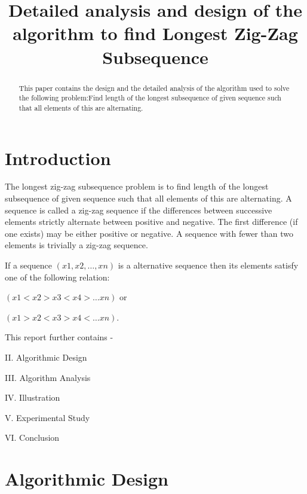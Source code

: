 \documentclass[conference]{IEEEtran}
\begin{document}
\title{Detailed analysis and design of the algorithm to find Longest Zig-Zag Subsequence\\

}

\author{
\and
{}
\and
{}
}

\maketitle

\begin{abstract}
This paper contains the design and the detailed analysis of the algorithm used to solve the following problem:Find length of the longest
subsequence of given sequence such that all elements of this are
alternating.
\end{abstract}
\section{Introduction}


The longest zig-zag subsequence problem is to find length of the longest
subsequence of given sequence such that all elements of this are
alternating. A sequence is called a zig-zag sequence if the differences between successive elements strictly alternate between positive and negative. The first difference (if one exists) may be either positive or negative. A sequence with fewer than two elements is trivially a zig-zag sequence.

If a sequence $(x1,x2,\dots,xn)$ is a alternative sequence then its elements satisfy one of the following relation:

$(x1<x2>x3<x4>\dots xn)$ or

$(x1>x2<x3>x4<\dots xn)$.

This report further contains -

II. Algorithmic Design

III. Algorithm Analysis

IV. Illustration

V. Experimental Study

VI. Conclusion 

\section{Algorithmic Design}
\end{document}
